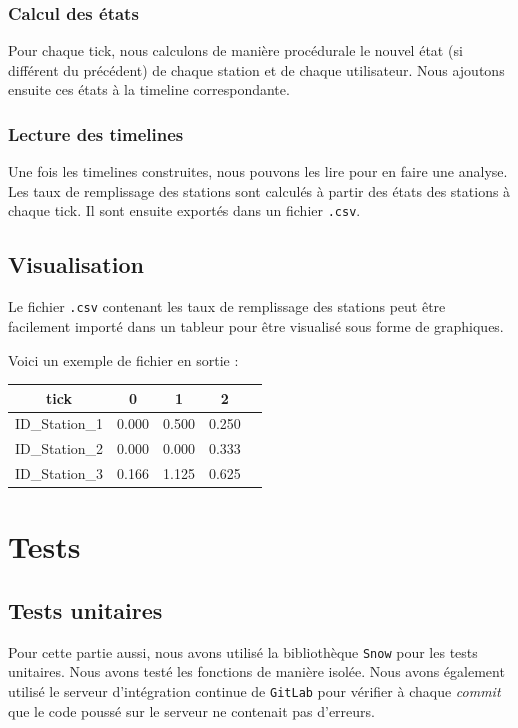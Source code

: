 \documentclass[a4paper, 12pt]{report}
\begin{document}
\subsubsection{Calcul des états}
Pour chaque tick, nous calculons de manière procédurale le nouvel état (si différent du précédent) de chaque station et de chaque utilisateur. Nous ajoutons ensuite ces états à la timeline correspondante.\par\bigskip
\subsubsection{Lecture des timelines}
Une fois les timelines construites, nous pouvons les lire pour en faire une analyse. Les taux de remplissage des stations sont calculés à partir des états des stations à chaque tick. Il sont ensuite exportés dans un fichier \texttt{.csv}.\par\bigskip
\subsection{Visualisation}
Le fichier \texttt{.csv} contenant les taux de remplissage des stations peut être facilement importé dans un tableur pour être visualisé sous forme de graphiques.\par\bigskip
Voici un exemple de fichier en sortie :\par\bigskip
\begin{table}[htbp]
    \centering\begin{tabular}{|c|c|c|c|c|}
        \hline
        tick & 0 & 1 & 2 \\
        \hline\hline
        ID\_Station\_1 & 0.000 & 0.500 & 0.250 \\
        \hline
        ID\_Station\_2 & 0.000 & 0.000 & 0.333 \\
        \hline
        ID\_Station\_3 & 0.166 & 1.125 & 0.625 \\
        \hline
        \end{tabular}
\end{table}

\section{Tests}
\subsection{Tests unitaires}
Pour cette partie aussi, nous avons utilisé la bibliothèque \texttt{Snow} pour les tests unitaires. Nous avons testé les fonctions de manière isolée. Nous avons également utilisé le serveur d'intégration continue de \texttt{GitLab} pour vérifier à chaque \textit{commit} que le code poussé sur le serveur ne contenait pas d'erreurs.\par\bigskip
\end{document}
